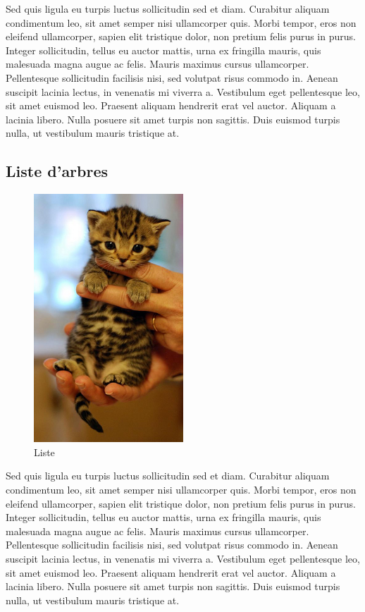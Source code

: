 		Sed quis ligula eu turpis luctus sollicitudin sed et diam. Curabitur aliquam condimentum leo, sit amet semper nisi ullamcorper quis. Morbi tempor, eros non eleifend ullamcorper, sapien elit tristique dolor, non pretium felis purus in purus. Integer sollicitudin, tellus eu auctor mattis, urna ex fringilla mauris, quis malesuada magna augue ac felis. Mauris maximus cursus ullamcorper. Pellentesque sollicitudin facilisis nisi, sed volutpat risus commodo in. Aenean suscipit lacinia lectus, in venenatis mi viverra a. Vestibulum eget pellentesque leo, sit amet euismod leo. Praesent aliquam hendrerit erat vel auctor. Aliquam a lacinia libero. Nulla posuere sit amet turpis non sagittis. Duis euismod turpis nulla, ut vestibulum mauris tristique at. 

	\subsection{Liste d'arbres}
		\begin{figure}
			\begin{center}
				\includegraphics[width=0.5\textwidth]{figure/liste.png}
			\end{center}
			\caption{Liste}
			\label{fig:liste}
		\end{figure}

		Sed quis ligula eu turpis luctus sollicitudin sed et diam. Curabitur aliquam condimentum leo, sit amet semper nisi ullamcorper quis. Morbi tempor, eros non eleifend ullamcorper, sapien elit tristique dolor, non pretium felis purus in purus. Integer sollicitudin, tellus eu auctor mattis, urna ex fringilla mauris, quis malesuada magna augue ac felis. Mauris maximus cursus ullamcorper. Pellentesque sollicitudin facilisis nisi, sed volutpat risus commodo in. Aenean suscipit lacinia lectus, in venenatis mi viverra a. Vestibulum eget pellentesque leo, sit amet euismod leo. Praesent aliquam hendrerit erat vel auctor. Aliquam a lacinia libero. Nulla posuere sit amet turpis non sagittis. Duis euismod turpis nulla, ut vestibulum mauris tristique at.

